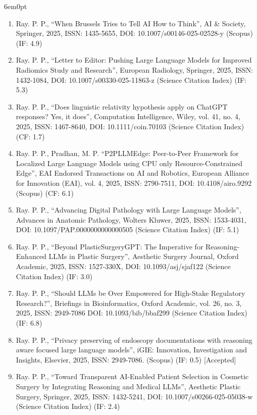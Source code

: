 \documentclass[11pt,a4paper]{moderncv}
\begin{document}
\begin{adjustwidth}{6em}{0pt}
\begin{enumerate}
		\item Ray. P. P., “When Brussels Tries to Tell AI How to Think”, AI \& Society, Springer, 2025, ISSN: 1435-5655, DOI: 10.1007/s00146-025-02528-y (Scopus) (IF: 4.9) 
		
		\item Ray. P. P., “Letter to Editor: Pushing Large Language Models for Improved Radiomics Study and Research”, European Radiology, Springer, 2025, ISSN: 1432-1084, DOI: 10.1007/s00330-025-11863-z (Science Citation Index) (IF: 5.3)
		
		\item Ray. P. P., “Does linguistic relativity hypothesis apply on ChatGPT responses? Yes, it does”, Computation Intelligence, Wiley, vol. 41, no. 4, 2025, ISSN: 1467-8640, DOI: 10.1111/coin.70103 (Science Citation Index) (CF: 1.7)
		
		\item Ray. P. P., Pradhan, M. P. “P2PLLMEdge: Peer-to-Peer Framework for Localized Large Language Models using CPU only Resource-Constrained Edge”, EAI Endorsed Transactions on AI and Robotics, European Alliance for Innovation (EAI), vol. 4, 2025, ISSN: 2790-7511, DOI: 10.4108/airo.9292 (Scopus) (CF: 6.1)
		
		\item Ray. P. P., “Advancing Digital Pathology with Large Language Models”, Advances in Anatomic Pathology, Wolters Kluwer, 2025, ISSN: 1533-4031, DOI: 10.1097/PAP.0000000000000505 (Science Citation Index) (IF: 5.1)
		
		\item Ray. P. P., “Beyond PlasticSurgeryGPT: The Imperative for Reasoning-Enhanced LLMs in Plastic Surgery”, Aesthetic Surgery Journal, Oxford Academic, 2025, ISSN: 1527-330X, DOI: 10.1093/asj/sjaf122 (Science Citation Index) (IF: 3.0)
		
		\item Ray. P. P., “Should LLMs be Over Empowered for High-Stake Regulatory Research?”, Briefings in Bioinformatics, Oxford Academic, vol. 26, no. 3, 2025, ISSN: 2949-7086 DOI: 10.1093/bib/bbaf299 (Science Citation Index) (IF: 6.8)
		
		\item Ray. P. P., “Privacy preserving of endoscopy documentations with reasoning aware focused large language models”, iGIE: Innovation, Investigation and Insights, Elsevier, 2025, ISSN: 2949-7086. (Scopus) (IF: 0.5) [Accepted]
		
		\item Ray. P. P., “Toward Transparent AI-Enabled Patient Selection in Cosmetic Surgery by Integrating Reasoning and Medical LLMs”, Aesthetic Plastic Surgery, Springer, 2025, ISSN: 1432-5241, DOI: 10.1007/s00266-025-05038-w (Science Citation Index) (IF: 2.4) 
		

\end{enumerate}
\end{adjustwidth}
\end{document}
